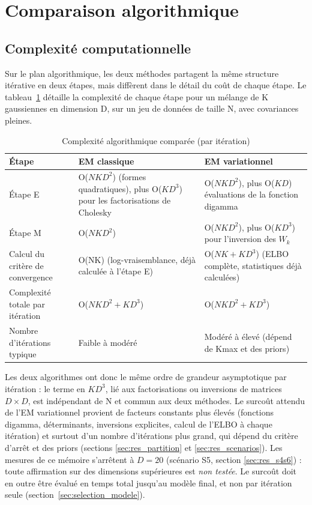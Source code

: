 


\section{Comparaison algorithmique}\label{sec:comparaison_algorithmique}
\subsection{Complexité computationnelle}\label{sec:complexite_computationnelle}
Sur le plan algorithmique, les deux méthodes partagent la même structure itérative en deux étapes, mais diffèrent dans le détail du coût de chaque étape. Le tableau~\ref{tab:2_3} détaille la complexité de chaque étape pour un mélange de K gaussiennes en dimension D, sur un jeu de données de taille N, avec covariances pleines.

\begin{table}[H]
\centering
\small
\setlength{\tabcolsep}{0.14cm}
\begin{tabular}{|p{4.84cm}|p{4.84cm}|p{4.84cm}|}
\hline
\textbf{Étape} & \textbf{EM classique} & \textbf{EM variationnel} \\
\hline
Étape E & O($NKD^{2}$) (formes quadratiques), plus O($KD^{3}$) pour les factorisations de Cholesky & O($NKD^{2}$), plus O($KD$) évaluations de la fonction digamma \\
\hline
Étape M & O($NKD^{2}$) & O($NKD^{2}$), plus O($KD^{3}$) pour l'inversion des $W_{k}$ \\
\hline
Calcul du critère de convergence & O(NK) (log-vraisemblance, déjà calculée à l'étape E) & O($NK + KD^{3}$) (ELBO complète, statistiques déjà calculées) \\
\hline
Complexité totale par itération & O($NKD^{2} + KD^{3}$) & O($NKD^{2} + KD^{3}$) \\
\hline
Nombre d'itérations typique & Faible à modéré & Modéré à élevé (dépend de Kmax et des priors) \\
\hline
\end{tabular}
\caption{Complexité algorithmique comparée (par itération)}
\label{tab:2_3}
\end{table}
Les deux algorithmes ont donc le même ordre de grandeur asymptotique par itération : le terme en $KD^{3}$, lié aux factorisations ou inversions de matrices $D \times D$, est indépendant de N et commun aux deux méthodes. Le surcoût attendu de l'EM variationnel provient de facteurs constants plus élevés (fonctions digamma, déterminants, inversions explicites, calcul de l'ELBO à chaque itération) et surtout d'un nombre d'itérations plus grand, qui dépend du critère d'arrêt et des priors (sections \ref{sec:res_partition} et \ref{sec:res_scenarios}). Les mesures de ce mémoire s'arrêtent à $D = 20$ (scénario S5, section \ref{sec:res_s4s6}) : toute affirmation sur des dimensions supérieures est \emph{non testée}. Le surcoût doit en outre être évalué en temps total jusqu'au modèle final, et non par itération seule (section~\ref{sec:selection_modele}).

